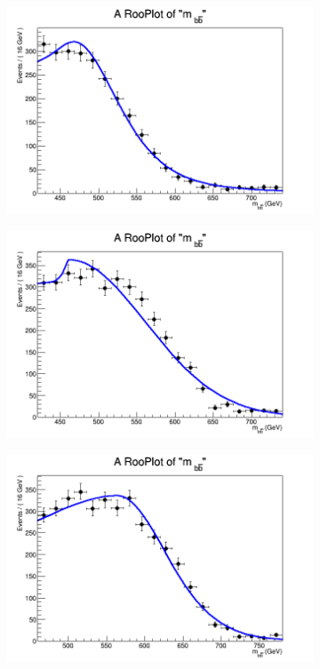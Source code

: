 \begin{figure}[phtb!]
\begin{center}
  \begin{subfigure}[$m_{A}=550$ GeV]{0.4\textwidth}\includegraphics[width=\textwidth]{FitResults/images/fitMC_bAbb550_3.png}\end{subfigure}
  \begin{subfigure}[$m_{A}=600$ GeV]{0.4\textwidth}\includegraphics[width=\textwidth]{FitResults/images/fitMC_bAbb600_3.png}\end{subfigure}
  \begin{subfigure}[$m_{A}=650$ GeV]{0.4\textwidth}\includegraphics[width=\textwidth]{FitResults/images/fitMC_bAbb650_3.png}\end{subfigure}

\end{center}
\end{figure}
